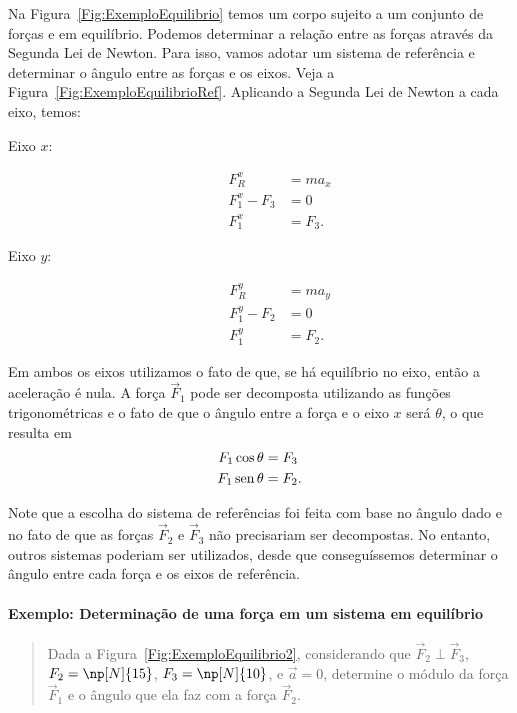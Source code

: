 Na Figura~\ref{Fig:ExemploEquilibrio} temos um corpo sujeito a um conjunto de forças e em equilíbrio. Podemos determinar a relação entre as forças através da Segunda Lei de Newton. Para isso, vamos adotar um sistema de referência e determinar o ângulo entre as forças e os eixos. Veja a Figura~\ref{Fig:ExemploEquilibrioRef}. Aplicando a Segunda Lei de Newton a cada eixo, temos:
\begin{description}
    \item[Eixo $x$:]
        \begin{align}
            F_R^x &= m a_x \\
            F_1^x - F_3 &= 0 \\
            F_1^x &= F_3.
        \end{align}
    \item[Eixo $y$:]
        \begin{align}
            F_R^y &= m a_y \\
            F_1^y - F_2 &= 0 \\
            F_1^y &= F_2.
        \end{align}
\end{description}
%
Em ambos os eixos utilizamos o fato de que, se há equilíbrio no eixo, então a aceleração é nula. A força $\vec{F}_1$ pode ser decomposta utilizando as funções trigonométricas e o fato de que o ângulo entre a força e o eixo $x$ será $\theta$, o que resulta em
\begin{align}
    F_1 \cos\theta &= F_3 \\
    F_1 \operatorname{sen}\theta &= F_2.
\end{align}

Note que a escolha do sistema de referências foi feita com base no ângulo dado e no fato de que as forças $\vec{F}_2$ e $\vec{F}_3$ não precisariam ser decompostas. No entanto, outros sistemas poderiam ser utilizados, desde que conseguíssemos determinar o ângulo entre cada força e os eixos de referência.

\paragraph{Exemplo: Determinação de uma força em um sistema em equilíbrio}

\begin{quote}
    Dada a Figura~\ref{Fig:ExemploEquilibrio2}, considerando que $\vec{F}_2 \perp \vec{F}_3$, $F_2 = \np[N]{15}$, $F_3 = \np[N]{10}$, e $\vec{a} = 0$, determine o módulo da força $\vec{F}_1$ e o ângulo que ela faz com a força $\vec{F}_2$.
\end{quote}

